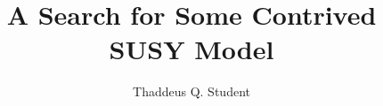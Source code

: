 
\title{A Search for Some Contrived SUSY Model} 

\author{Thaddeus Q. Student}

\newcommand{\adviser}{Gerald Advisor, Associate Professor, Physics}
\newcommand{\advisershort}{G. Advisor}

\newcommand{\myinstitution}{The University of Pennsylvania}

\newcommand{\chairperson}{Joshua Klein, Professor, Physics}

\newcommand{\committeeOne}{(Committee Prof. 1), Professor, Physics}
\newcommand{\committeeTwo}{(Committee Prof. 2), Associate Professor, Physics}
\newcommand{\committeeThree}{(Committee Prof. 3), Professor, Physics}
\newcommand{\committeeFour}{(Committee Prof. 4), Professor, Physics}





